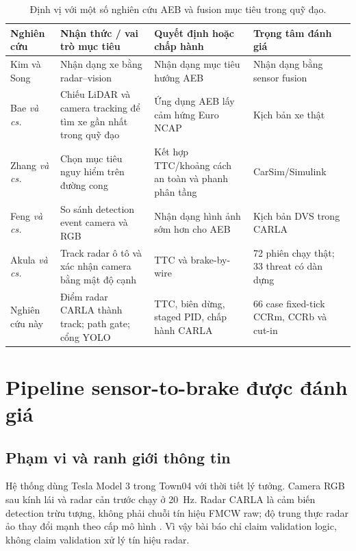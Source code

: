 \documentclass[conference]{IEEEtran}
\begin{document}
\begin{table}[t]
\caption{Định vị với một số nghiên cứu AEB và fusion mục tiêu trong quỹ đạo.}
\label{tab:positioning}
\centering
\footnotesize
\begin{tabular}{p{}p{}p{}p{}}
\toprule
Nghiên cứu & Nhận thức / vai trò mục tiêu & Quyết định hoặc chấp hành & Trọng tâm đánh giá \\
\midrule
Kim và Song \cite{kim2013vehicle} & Nhận dạng xe bằng radar--vision & Nhận dạng mục tiêu hướng AEB & Nhận dạng bằng sensor fusion \\
Bae \emph{và cs.} \cite{bae2021cipv} & Chiếu LiDAR và camera tracking để tìm xe gần nhất trong quỹ đạo & Ứng dụng AEB lấy cảm hứng Euro NCAP & Kịch bản xe thật \\
Zhang \emph{và cs.} \cite{zhang2023curved} & Chọn mục tiêu nguy hiểm trên đường cong & Kết hợp TTC/khoảng cách an toàn và phanh phân tầng & CarSim/Simulink \\
Feng \emph{và cs.} \cite{feng2025dvs} & So sánh detection event camera và RGB & Nhận dạng hình ảnh sớm hơn cho AEB & Kịch bản DVS trong CARLA \\
Akula \emph{và cs.} \cite{akula2026radarguided} & Track radar ô tô và xác nhận camera bằng mật độ cạnh & TTC và brake-by-wire & 72 phiên chạy thật; 33 threat có dàn dựng \\
Nghiên cứu này & Điểm radar CARLA thành track; path gate; cổng YOLO & TTC, biên dừng, staged PID, chấp hành CARLA & 66 case fixed-tick CCRm, CCRb và cut-in \\
\bottomrule
\end{tabular}
\end{table}

\section{Pipeline sensor-to-brake được đánh giá}
\subsection{Phạm vi và ranh giới thông tin}
Hệ thống dùng Tesla Model 3 trong Town04 với thời tiết lý tưởng. Camera RGB sau
kính lái và radar cản trước chạy ở 20~Hz. Radar CARLA là cảm biến detection trừu
tượng, không phải chuỗi tín hiệu FMCW raw; độ trung thực radar ảo thay đổi mạnh
theo cấp mô hình \cite{magosi2022radar}. Vì vậy bài báo chỉ claim validation
logic, không claim validation xử lý tín hiệu radar.
\end{document}
